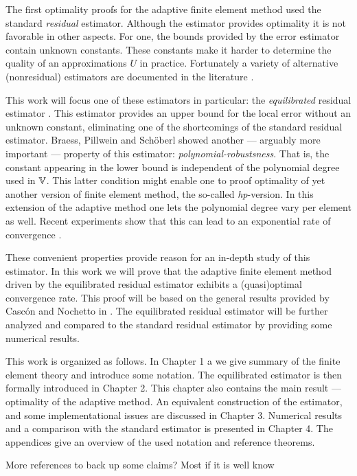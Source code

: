 \documentclass[thesis.tex]{subfiles}
\begin{document}
The first optimality proofs for the adaptive finite element method used the standard \emph{residual} estimator. Although
the estimator provides optimality it is not favorable in other aspects. For one, the bounds provided
by the error estimator contain unknown constants. These constants make it harder to determine the quality of an 
approximations $U$ in practice.  Fortunately a variety of alternative (nonresidual) estimators are documented in the literature \cite{verfurth2013posteriori}.

This work will focus one of these estimators in particular:
the \emph{equilibrated} residual estimator \cite{braessequil, braessequilrobust, ernequil}. This estimator provides an upper bound
for the local error without an unknown constant, eliminating one of the shortcomings of the standard residual estimator. 
Braess, Pillwein and Sch\"oberl \cite{braessequilrobust} showed another --- arguably more important --- property of this estimator: \emph{polynomial-robustsness}. That is,
the constant appearing in the lower bound is independent of the polynomial degree used in $\mathbb{V}$.
This latter condition might enable one to proof optimality of yet another version of finite element method, the so-called
\emph{hp}-version. In this extension of the adaptive method one lets the polynomial degree vary per element as well.
Recent experiments show that this can lead to an exponential rate of convergence \cite{dolejvsi2015hp}.

These convenient properties provide reason for an in-depth study of this estimator.
In this work we will prove that the adaptive finite element method driven by the equilibrated residual estimator 
exhibits a (quasi)optimal convergence rate. This proof will be based on the general results provided by Casc\'on and Nochetto 
in \cite{cascon2012}. The equilibrated residual estimator will be further analyzed and compared to the standard residual estimator
by providing some numerical results. 

This work is organized as follows.
In Chapter 1 a we give summary of the finite element theory and introduce some notation. The equilibrated estimator is then formally introduced 
in Chapter 2. This chapter also contains the main result --- optimality of the adaptive method. An equivalent construction of the estimator,
and some implementational issues are discussed in Chapter 3. Numerical results and a comparison with the standard estimator is presented
in Chapter 4. The appendices give an overview of the used notation and reference theorems.

{\color{blue} More references to back up some claims? Most if it is well know}
\end{document}
